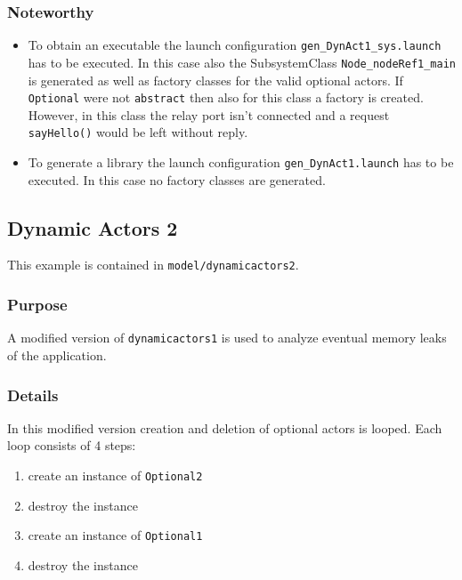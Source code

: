 \subsubsection{Noteworthy}

\begin{itemize}
\item To obtain an executable the launch configuration \texttt{gen\_DynAct1\_sys.launch} has to be executed.
In this case also the SubsystemClass \texttt{Node\_nodeRef1\_main} is generated as well as factory classes
for the valid optional actors. If \texttt{Optional} were not \texttt{abstract} then also for this class
a factory is created. However, in this class the relay port isn't connected and a request \texttt{sayHello()}
would be left without reply.
\item To generate a library the launch configuration \texttt{gen\_DynAct1.launch} has to be executed.
In this case no factory classes are generated.
\end{itemize}


\subsection{Dynamic Actors 2}

This example is contained in \texttt{model/dynamicactors2}.

\subsubsection{Purpose}

A modified version of \texttt{dynamicactors1} is used to analyze eventual memory leaks of the application.

\subsubsection{Details}

In this modified version creation and deletion of optional actors is looped.
Each loop consists of 4 steps:

\begin{enumerate}
\item create an instance of \texttt{Optional2}
\item destroy the instance
\item create an instance of \texttt{Optional1}
\item destroy the instance
\end{enumerate}

